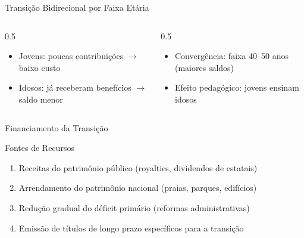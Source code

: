 \documentclass{libs/ufc_format}
\begin{document}
\begin{frame}{Transição Bidirecional por Faixa Etária}
    \begin{columns}
        \begin{column}{0.5\textwidth}
            \begin{itemize}
                \item[\tiny$\blacksquare$] Jovens: poucas contribuições $\to$ baixo custo
                \item[\tiny$\blacksquare$] Idosos: já receberam benefícios $\to$ saldo menor
            \end{itemize}
        \end{column}
        \begin{column}{0.5\textwidth}
            \begin{itemize}
                \item[\tiny$\blacksquare$] Convergência: faixa 40--50 anos (maiores saldos)
                \item[\tiny$\blacksquare$] Efeito pedagógico: jovens ensinam idosos
            \end{itemize}
        \end{column}
    \end{columns}
\end{frame}

\begin{frame}{Financiamento da Transição}
    \begin{block}{Fontes de Recursos}
        \begin{enumerate}
            \item Receitas do patrimônio público (royalties, dividendos de estatais)
            \item Arrendamento do patrimônio nacional (praias, parques, edifícios)
            \item Redução gradual do déficit primário (reformas administrativas)
            \item Emissão de títulos de longo prazo específicos para a transição
        \end{enumerate}
    \end{block}

    \vspace{0.3cm}

\end{frame}

\end{document}
